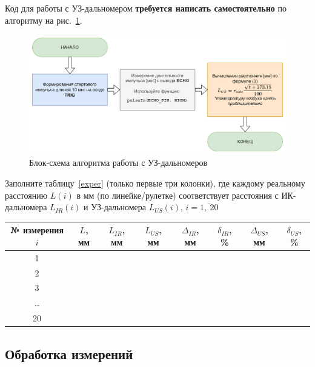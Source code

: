 \documentclass[12pt]{article}
\begin{document}
Код для работы с УЗ-дальномером \textbf{требуется написать самостоятельно} по алгоритму на рис.~\ref{fig:algoritm}.

\begin{figure}[H]
	\centering
	\includegraphics[width=1.0\linewidth]{images/algoritm}
	\caption{Блок-схема алгоритма работы с УЗ-дальномеров}
	\label{fig:algoritm}
\end{figure}

Заполните таблицу~\ref{exper} (только первые три колонки), где каждому реальному расстоянию \(L(i)\) в мм (по линейке/рулетке) соответствует расстояния с ИК-дальномера \(L_{IR}(i)\) и УЗ-дальномера \(L_{US}(i)\), \(i=\overline{1,\:20}\) 

\begin{table}[H]
	\centering
	\caption{Результаты}\label{exper}
	\begin{longtable}{c|c|c|c|c|c|c|c}
		\toprule
		№ измерения \(i\) & \(L\), мм & \(L_{IR}\), мм & \(L_{US}\), мм  & \(\Delta_{IR}\), мм & \(\delta_{IR}\), \% & \(\Delta_{US}\), мм & \(\delta_{US}\), \% \\
		\midrule
		1 &&&&&&& \\
		\hline
		2 &&&&&&& \\
		\hline
		3 &&&&&&& \\
		\hline
		\dots &&&&&&& \\
		\hline
		20 &&&&&&& \\
		\bottomrule
	\end{longtable}
\end{table}

\subsection{Обработка измерений}
\end{document}
